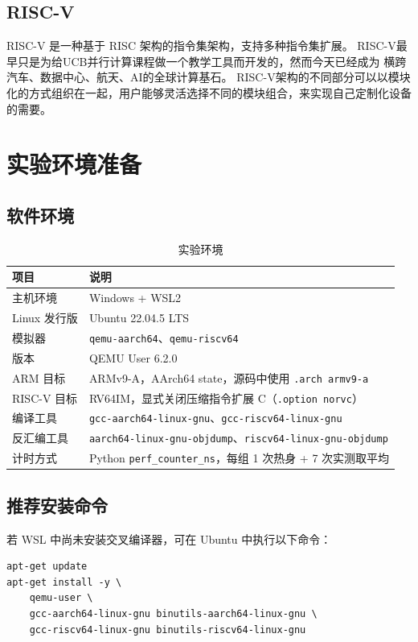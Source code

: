\documentclass{article}
\begin{document}
\subsection{RISC-V}
RISC-V 是一种基于 RISC 架构的指令集架构，支持多种指令集扩展。
RISC-V最早只是为给UCB并行计算课程做一个教学工具而开发的，然而今天已经成为
横跨汽车、数据中心、航天、AI的全球计算基石。
RISC-V架构的不同部分可以以模块化的方式组织在一起，用户能够灵活选择不同的模块组合，来实现自己定制化设备的需要。


\section{实验环境准备}
\subsection{软件环境}
\begin{table}[H]
    \centering
    \caption{实验环境}
    \begin{tabular}{p{} p{}}
        \toprule
        项目 & 说明 \\
        \midrule
        主机环境 & Windows + WSL2 \\
        Linux 发行版 & Ubuntu 22.04.5 LTS \\
        模拟器 & \texttt{qemu-aarch64}、\texttt{qemu-riscv64} \\
        版本 & QEMU User 6.2.0 \\
        ARM 目标 & ARMv9-A，AArch64 state，源码中使用 \texttt{.arch armv9-a} \\
        RISC-V 目标 & RV64IM，显式关闭压缩指令扩展 C（\texttt{.option norvc}） \\
        编译工具 & \texttt{gcc-aarch64-linux-gnu}、\texttt{gcc-riscv64-linux-gnu} \\
        反汇编工具 & \texttt{aarch64-linux-gnu-objdump}、\texttt{riscv64-linux-gnu-objdump} \\
        计时方式 & Python \texttt{perf\_counter\_ns}，每组 1 次热身 + 7 次实测取平均 \\
        \bottomrule
    \end{tabular}
\end{table}

\subsection{推荐安装命令}
若 WSL 中尚未安装交叉编译器，可在 Ubuntu 中执行以下命令：
\begin{Verbatim}[frame=single]
apt-get update
apt-get install -y \
    qemu-user \
    gcc-aarch64-linux-gnu binutils-aarch64-linux-gnu \
    gcc-riscv64-linux-gnu binutils-riscv64-linux-gnu
\end{Verbatim}
\end{document}
